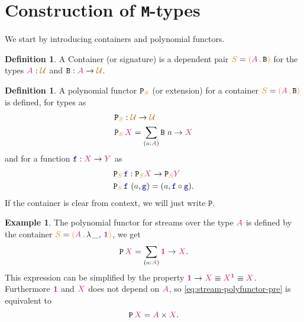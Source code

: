 \documentclass[twoside,11pt,openright]{report}
\theoremstyle{plain} %
\theoremstyle{definition}
\newtheorem{defn}[thm]{Definition}%
\newtheorem{exmp}{Example} %
\theoremstyle{remark}
\newcommand*{\term}[1]{\textcolor{green!30!black}{#1}} %
\newcommand*{\type}[1]{\textcolor{magenta!90!black}{#1}}
\newcommand*{\container}[1]{\textcolor{orange}{#1}}
\newcommand*{\containerpair}[2]{\ensuremath{\colorlet{savedleftcolor}{.}\color{orange}\left(\color{savedleftcolor}#1\,\textcolor{orange}{\mathbf{,}}\,#2\color{orange}\right)\color{savedleftcolor}}}
\newcommand*{\containerpairsimple}[2]{\containerpair{#1}{\lambda\,\_,\,#2}}
\newcommand*{\universe}[1]{\textcolor{orange!80!black}{#1}}
\newcommand*{\unit}{\type{\textbf{1}}}
\newcommand*{\function}[1]{\textcolor{blue!60!black}{\ensuremath{\mathtt{#1}}}}
\newcommand*{\typeformer}[1]{\ensuremath{\mathtt{#1}}}
\newcommand*{\functor}[1]{\ensuremath{\mathbf{\mathtt{#1}}}}
\begin{document}
\section{Construction of \texttt{M}-types}
We start by introducing containers and polynomial functors.
\begin{defn}
  A Container (or signature) is a dependent pair \(\container{S} = \containerpair{\type{A}}{\typeformer{B}}\) for the types \(\type{A} : \universe{\mathcal{U}}\) and \(\typeformer{B} : \type{A} \rightarrow \universe{\mathcal{U}}\). 
\end{defn}
\begin{defn}
  A polynomial functor \(\functor{P}_{\container{S}}\) (or extension) for a container \(\container{S} = \containerpair{\type{A}}{\typeformer{B}}\) is defined, for types as
  \begin{equation}
    \begin{aligned}
      &\functor{P}_{\container{S}} : \universe{\mathcal{U}} \rightarrow \universe{\mathcal{U}} \\
      &\functor{P}_{\container{S}}\,\type{X} = \sum_{(\term{a} : \type{A})} \typeformer{B}~\term{a} \rightarrow \type{X}
    \end{aligned}
  \end{equation}
  and for a function \(\function{f} : \type{X} \rightarrow \type{Y}\) as
  \begin{equation}
    \begin{aligned}
      &\functor{P}_{\container{S}}\,\function{f} : \functor{P}_{\container{S}}\type{X} \rightarrow \functor{P}_{\container{S}}\type{Y} \\
      &\functor{P}_{\container{S}}\,\function{f}~(\term{a},\function{g}) = (\term{a}, \function{f} \circ \function{g}).
    \end{aligned}
  \end{equation}
  If the container is clear from context, we will just write \(\functor{P}\).
\end{defn}
\begin{exmp}
  \label{exmp:stream-polyfunctor-example}
  The polynomial functor for streams over the type \(\type{A}\) is defined by the container \(\container{S} = \containerpairsimple{\type{A}}{\unit}\), we get
  \begin{equation}
    \label{eq:stream-polyfunctor-pre}
    \functor{P}\,\type{X} = \sum_{(\term{a} : \type{A})} \unit \rightarrow \type{X}.
  \end{equation}
  This expression can be simplified by the property \(\unit \rightarrow \type{X} \equiv \type{X}^{\unit} \equiv \type{X}\). Furthermore \(\unit\) and \(\type{X}\) does not depend on \(\type{A}\), so \eqref{eq:stream-polyfunctor-pre} is equivalent to
  \begin{equation}
    \functor{P}\,\type{X} = \type{A} \times \type{X}.
  \end{equation}
\end{exmp}
\end{document}
